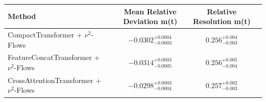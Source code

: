     \begin{tabular}{lccc}
        \toprule
        Method & Mean Relative Deviation m(t) & Relative Resolution m(t) \\
        \midrule
        CompactTransformer + $\nu^2$-Flows & $-0.0302_{-0.0003}^{+0.0004}$ & $0.256_{-0.003}^{+0.004}$ \\
        FeatureConcatTransformer + $\nu^2$-Flows & $-0.0314_{-0.0005}^{+0.0003}$ & $0.256_{-0.004}^{+0.005}$ \\
        CrossAttentionTransformer + $\nu^2$-Flows & $-0.0298_{-0.0004}^{+0.0003}$ & $0.257_{-0.003}^{+0.002}$ \\
        \bottomrule
    \end{tabular}